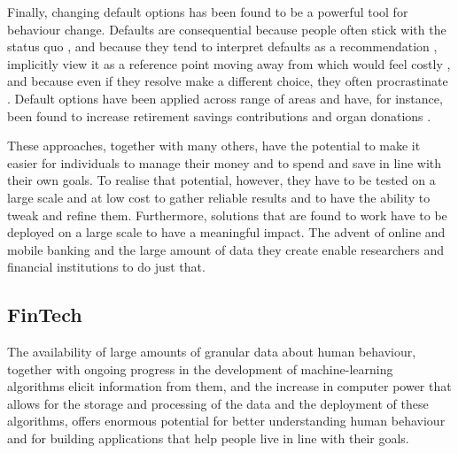 Finally, changing default options has been found to be a powerful tool for
behaviour change. Defaults are consequential because people often stick
with the status quo \citep{samuelson1988status}, and because they tend to
interpret defaults as a recommendation \citep{mckenzie2006recommendations},
implicitly view it as a reference point moving away from which would feel
costly \citep{johnson2003defaults, kahneman1979prospect}, and because even if
they resolve make a different choice, they often procrastinate
\citep{carroll2009optimal, ericson2017interaction}. Default options have been
applied across range of areas and have, for instance, been found to increase
retirement savings contributions \citep{madrian2001power,
beshears2009importance} and organ donations \citep{johnson2003defaults,
gimbel2003presumed, abadie2006impact}.

These approaches, together with many others, have the potential to make it
easier for individuals to manage their money and to spend and save in line with
their own goals. To realise that potential, however, they have to be tested on
a large scale and at low cost to gather reliable results and to have the
ability to tweak and refine them. Furthermore, solutions that are found to work
have to be deployed on a large scale to have a meaningful impact. The advent of
online and mobile banking and the large amount of data they create enable
researchers and financial institutions to do just that.


\subsection{FinTech}%
\label{sub:large_scale_data_and_fintech}

The availability of large amounts of granular data about human behaviour,
together with ongoing progress in the development of machine-learning
algorithms elicit information from them, and the increase in computer power
that allows for the storage and processing of the data and the deployment of
these algorithms, offers enormous potential for better understanding human
behaviour \citep{jaffe2014big, buyalskaya2021golden} and for building
applications that help people live in line with their goals.

